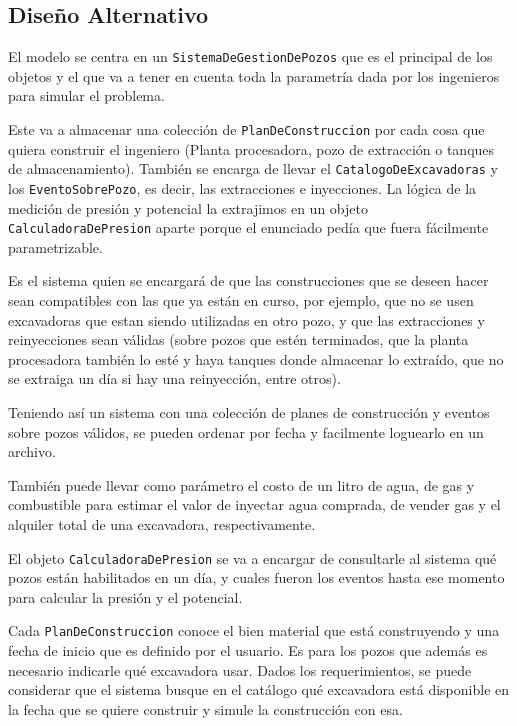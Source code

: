 \subsection{Diseño Alternativo}

El modelo se centra en un \texttt{SistemaDeGestionDePozos} que es el principal de los objetos y el que va a tener en cuenta toda la parametr\'ia dada por los ingenieros para simular el problema.

Este va a almacenar una colecci\'on de \texttt{PlanDeConstruccion} por cada cosa que quiera construir el ingeniero (Planta procesadora, pozo de extracci\'on o tanques de almacenamiento). Tambi\'en se encarga de llevar el \texttt{CatalogoDeExcavadoras} y los \texttt{EventoSobrePozo}, es decir, las extracciones e inyecciones. La l\'ogica de la medici\'on de presi\'on y potencial la extrajimos en un objeto \texttt{CalculadoraDePresion} aparte porque el enunciado ped\'ia que fuera f\'acilmente parametrizable.

Es el sistema quien se encargar\'a de que las construcciones que se deseen hacer sean compatibles con las que ya est\'an en curso, por ejemplo, que no se usen excavadoras que estan siendo utilizadas en otro pozo, y que las extracciones y reinyecciones sean v\'alidas (sobre pozos que est\'en terminados, que la planta procesadora tambi\'en lo est\'e y haya tanques donde almacenar lo extra\'ido, que no se extraiga un d\'ia si hay una reinyecci\'on, entre otros).

Teniendo as\'i un sistema con una colecci\'on de planes de construcci\'on y eventos sobre pozos v\'alidos, se pueden ordenar por fecha y facilmente loguearlo en un archivo.

Tambi\'en puede llevar como par\'ametro el costo de un litro de agua, de gas y combustible para estimar el valor de inyectar agua comprada, de vender gas y el alquiler total de una excavadora, respectivamente.

El objeto \texttt{CalculadoraDePresion} se va a encargar de consultarle al sistema qu\'e pozos est\'an habilitados en un d\'ia, y cuales fueron los eventos hasta ese momento para calcular la presi\'on y el potencial.

Cada \texttt{PlanDeConstruccion} conoce el bien material que est\'a construyendo y una fecha de inicio que es definido por el usuario. Es para los pozos que adem\'as es necesario indicarle qu\'e excavadora usar. Dados los requerimientos, se puede considerar que el sistema busque en el cat\'alogo qu\'e excavadora est\'a disponible en la fecha que se quiere construir y simule la construcci\'on con esa.

